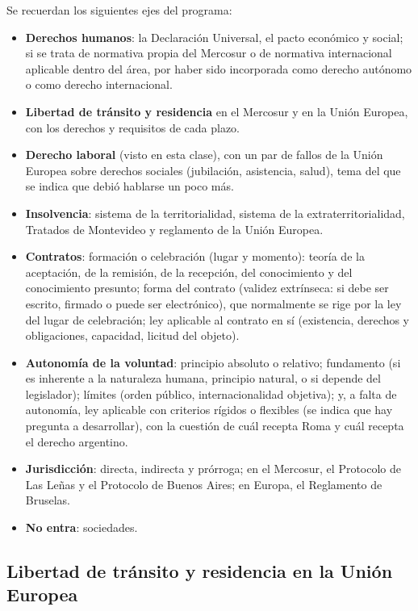 \documentclass[12pt,oneside]{book}
\begin{document}
Se recuerdan los siguientes ejes del programa:
\begin{itemize}
    \item \textbf{Derechos humanos}: la Declaración Universal, el pacto económico y social; si se trata de normativa propia del Mercosur o de normativa internacional aplicable dentro del área, por haber sido incorporada como derecho autónomo o como derecho internacional.
    \item \textbf{Libertad de tránsito y residencia} en el Mercosur y en la Unión Europea, con los derechos y requisitos de cada plazo.
    \item \textbf{Derecho laboral} (visto en esta clase), con un par de fallos de la Unión Europea sobre derechos sociales (jubilación, asistencia, salud), tema del que se indica que debió hablarse un poco más.
    \item \textbf{Insolvencia}: sistema de la territorialidad, sistema de la extraterritorialidad, Tratados de Montevideo y reglamento de la Unión Europea.
    \item \textbf{Contratos}: formación o celebración (lugar y momento): teoría de la aceptación, de la remisión, de la recepción, del conocimiento y del conocimiento presunto; forma del contrato (validez extrínseca: si debe ser escrito, firmado o puede ser electrónico), que normalmente se rige por la ley del lugar de celebración; ley aplicable al contrato en sí (existencia, derechos y obligaciones, capacidad, licitud del objeto).
    \item \textbf{Autonomía de la voluntad}: principio absoluto o relativo; fundamento (si es inherente a la naturaleza humana, principio natural, o si depende del legislador); límites (orden público, internacionalidad objetiva); y, a falta de autonomía, ley aplicable con criterios rígidos o flexibles (se indica que hay pregunta a desarrollar), con la cuestión de cuál recepta Roma y cuál recepta el derecho argentino.
    \item \textbf{Jurisdicción}: directa, indirecta y prórroga; en el Mercosur, el Protocolo de Las Leñas y el Protocolo de Buenos Aires; en Europa, el Reglamento de Bruselas.
    \item \textbf{No entra}: sociedades.
\end{itemize}

\subsection{Libertad de tránsito y residencia en la Unión Europea}
\end{document}
